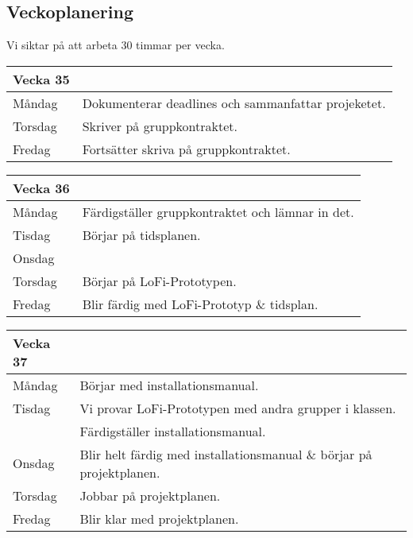 \documentclass{TDP003mall}
\begin{document}
\subsection{Veckoplanering}
Vi siktar på att arbeta 30 timmar per vecka.
\begin{table}[!h]
    \begin{tabularx}{\textwidth}{l|l}
        Vecka 35\\\hline
        Måndag  & Dokumenterar deadlines och sammanfattar projeketet.\\
        Torsdag & Skriver på gruppkontraktet.\\
        Fredag  & Fortsätter skriva på gruppkontraktet.\\
    \end{tabularx}
\end{table}

\begin{table}[!h]
    \begin{tabularx}{\textwidth}{l|l}
        Vecka 36\\\hline
        Måndag  & Färdigställer gruppkontraktet och lämnar in det.\\ %
        Tisdag  & Börjar på tidsplanen.\\
        Onsdag  & \\ %
        Torsdag & Börjar på LoFi-Prototypen.\\ %
        Fredag  & Blir färdig med LoFi-Prototyp \& tidsplan.\\
    \end{tabularx}
\end{table}

\begin{table}[!h]
    \begin{tabularx}{\textwidth}{l|l}
        Vecka 37\\\hline
        Måndag  & Börjar med installationsmanual.\\ %
        Tisdag  & Vi provar LoFi-Prototypen med andra grupper i klassen.\\
                & Färdigställer installationsmanual.\\
        Onsdag  & Blir helt färdig med installationsmanual \& börjar på projektplanen.\\ %
        Torsdag & Jobbar på projektplanen.\\ %
        Fredag  & Blir klar med projektplanen.\\ %
    \end{tabularx}
\end{table}
\end{document}
